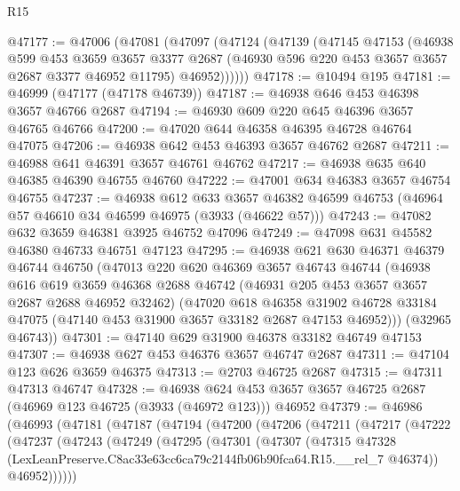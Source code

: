 \begin{lexlean}{R15}
\begin{coremodule}
@47177 := @47006
    (@47081
      (@47097
        (@47124
          (@47139
            (@47145
              @47153
              (@46938
                @599
                @453
                @3659
                @3657
                @3377
                @2687
                (@46930 @596 @220 @453 @3657 @3657 @2687 @3377 @46952 @11795)
                @46952))))))
@47178 := @10494 @195
@47181 := @46999 (@47177 (@47178 @46739))
@47187 := @46938 @646 @453 @46398 @3657 @46766 @2687
@47194 := @46930 @609 @220 @645 @46396 @3657 @46765 @46766
@47200 := @47020 @644 @46358 @46395 @46728 @46764 @47075
@47206 := @46938 @642 @453 @46393 @3657 @46762 @2687
@47211 := @46988 @641 @46391 @3657 @46761 @46762
@47217 := @46938 @635 @640 @46385 @46390 @46755 @46760
@47222 := @47001 @634 @46383 @3657 @46754 @46755
@47237 := @46938
    @612
    @633
    @3657
    @46382
    @46599
    @46753
    (@46964 @57 @46610 @34 @46599 @46975 (@3933 (@46622 @57)))
@47243 := @47082 @632 @3659 @46381 @3925 @46752 @47096
@47249 := @47098 @631 @45582 @46380 @46733 @46751 @47123
@47295 := @46938
    @621
    @630
    @46371
    @46379
    @46744
    @46750
    (@47013
      @220
      @620
      @46369
      @3657
      @46743
      @46744
      (@46938
        @616
        @619
        @3659
        @46368
        @2688
        @46742
        (@46931 @205 @453 @3657 @3657 @2687 @2688 @46952 @32462)
        (@47020
          @618
          @46358
          @31902
          @46728
          @33184
          @47075
          (@47140 @453 @31900 @3657 @33182 @2687 @47153 @46952)))
      (@32965 @46743))
@47301 := @47140 @629 @31900 @46378 @33182 @46749 @47153
@47307 := @46938 @627 @453 @46376 @3657 @46747 @2687
@47311 := @47104 @123 @626 @3659 @46375
@47313 := @2703 @46725 @2687
@47315 := @47311 @47313 @46747
@47328 := @46938
    @624
    @453
    @3657
    @3657
    @46725
    @2687
    (@46969 @123 @46725 (@3933 (@46972 @123)))
    @46952
@47379 := @46986
    (@46993
      (@47181
        (@47187
          (@47194
            (@47200
              (@47206
                (@47211
                  (@47217
                    (@47222
                      (@47237
                        (@47243
                          (@47249
                            (@47295
                              (@47301
                                (@47307
                                  (@47315
                                    @47328
                                    (LexLeanPreserve.C8ac33e63cc6ca79c2144fb06b90fca64.R15.__rel_7
                                      @46374))
                                  @46952))))))

\end{coremodule}
\end{lexlean}
